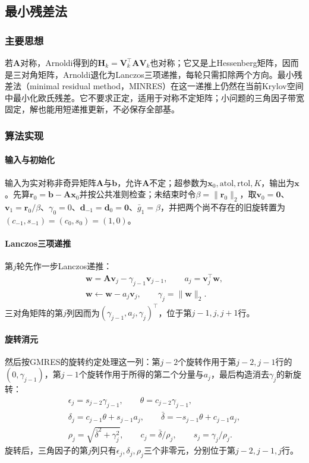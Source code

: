 \subsection{最小残差法}
\label{sec:ls-minres}

\subsubsection{主要思想}

若$\bm A$对称，Arnoldi得到的$\bm H_k=\bm V_k^\top\bm A\bm V_k$也对称；它又是上Hessenberg矩阵，因而是三对角矩阵，Arnoldi退化为Lanczos三项递推，每轮只需扣除两个方向。最小残差法（minimal residual method，MINRES）在这一递推上仍然在当前Krylov空间中最小化欧氏残差。它不要求正定，适用于对称不定矩阵；小问题的三角因子带宽固定，解也能用短递推更新，不必保存全部基。

\subsubsection{算法实现}

\paragraph{输入与初始化}
输入为实对称非奇异矩阵$\bm A$与$\bm b$，允许$\bm A$不定；超参数为$\bm x_0,\mathrm{atol},\mathrm{rtol},K$，输出为$\bm x$。先算$\bm r_0=\bm b-\bm A\bm x_0$并按公共准则检查；未结束时令$\beta=\lVert\bm r_0\rVert_2$，取$\bm v_0=\bm 0$、$\bm v_1=\bm r_0/\beta$、$\gamma_0=0$、$\bm d_{-1}=\bm d_0=\bm 0$、$\bar g_1=\beta$，并把两个尚不存在的旧旋转置为$(c_{-1},s_{-1})=(c_0,s_0)=(1,0)$。

\paragraph{Lanczos三项递推}
第$j$轮先作一步Lanczos递推：
\[
 \begin{gathered}
 \bm w=\bm A\bm v_j-\gamma_{j-1}\bm v_{j-1},\qquad a_j=\bm v_j^\top\bm w,\\
 \bm w\leftarrow\bm w-a_j\bm v_j,\qquad \gamma_j=\lVert\bm w\rVert_2 .
 \end{gathered}
\]
三对角矩阵的第$j$列因而为$(\gamma_{j-1},a_j,\gamma_j)^\top$，位于第$j-1,j,j+1$行。

\paragraph{旋转消元}
然后按GMRES的旋转约定处理这一列：第$j-2$个旋转作用于第$j-2,j-1$行的$(0,\gamma_{j-1})$，第$j-1$个旋转作用于所得的第二个分量与$a_j$，最后构造消去$\gamma_j$的新旋转：
\[
 \begin{gathered}
 \epsilon_j=s_{j-2}\gamma_{j-1},\qquad \theta=c_{j-2}\gamma_{j-1},\\
 \delta_j=c_{j-1}\theta+s_{j-1}a_j,\qquad
 \bar\delta=-s_{j-1}\theta+c_{j-1}a_j,\\
 \rho_j=\sqrt{\bar\delta^2+\gamma_j^2},\qquad
 c_j=\bar\delta/\rho_j,\qquad s_j=\gamma_j/\rho_j .
 \end{gathered}
\]
旋转后，三角因子的第$j$列只有$\epsilon_j,\delta_j,\rho_j$三个非零元，分别位于第$j-2,j-1,j$行。

